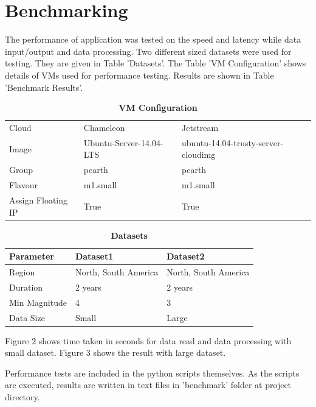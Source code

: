 \documentclass[9pt,twocolumn,twoside]{../../styles/osajnl}
\begin{document}
\section{Benchmarking}

The performance of application was tested on the speed and latency while data input/output and data processing. Two different sized datasets were used for testing. They are given in Table 'Datasets'. The Table 'VM Configuration' shows details of VMs used for performance testing. Results are shown in Table 'Benchmark Results'.
 

\begin{table}[htbp]
  
\begin{left}
\caption{\bf VM Configuration}
\begin{tabular}{ m{5em} m{2cm} m{2cm} } 
\hline
Cloud & Chameleon & Jetstream \\ 
Image & Ubuntu-Server-14.04-LTS & ubuntu-14.04-trusty-server-cloudimg \\ 
Group & pearth & pearth \\ 
Flavour & m1.small & m1.small \\ 
Assign Floating IP & True & True \\ 

\hline
\end{tabular}
\end{left}
\end{table} 

\begin{table}[htbp]
\begin{left}
\caption{\bf Datasets}
\begin{tabular}{ m{5em} m{2cm} m{2cm} } 
\hline
Parameter & Dataset1 & Dataset2 \\ 
\hline
Region & North, South America & North, South America \\ 
Duration & 2 years & 2 years \\ 
Min Magnitude & 4 & 3 \\ 
Data Size & Small & Large \\ 

\hline
\end{tabular}
\end{left}
\end{table} 

Figure 2 shows time taken in seconds for data read and data processing with small dataset. Figure 3 shows the result with large dataset.

Performance tests are included in the python scripts themselves. As the scripts are executed, results are written in text files in 'benchmark' folder at project directory.
\end{document}
